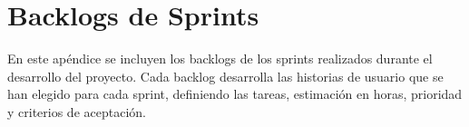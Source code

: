 \chapter{Backlogs de Sprints}
\label{chap:sprints_backlogs}
En este apéndice se incluyen los backlogs de los sprints realizados durante el desarrollo del proyecto. Cada backlog desarrolla las historias de usuario que se han elegido para cada sprint, definiendo las tareas, estimación en horas, prioridad y criterios de aceptación.


